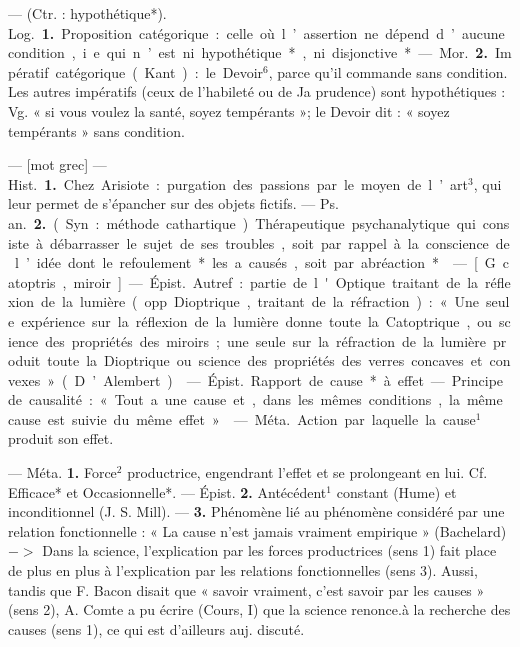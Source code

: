 \begin{itemize}[leftmargin=1cm, label=, itemsep=11pt]
 — (Ctr. : hypothétique*).
\si{Log.} {\bf 1.} Proposition catégorique :
celle où l’assertion ne dépend d’aucune condition, i. e. qui n’est ni
hypothétique*, ni disjonctive*.

— \si{Mor.}  {\bf 2.} Impératif catégorique
(Kant) : le Devoir$^6$, parce qu'il
commande sans condition. Les
autres impératifs (ceux de l’habileté
ou de Ja prudence) sont hypothétiques : Vg. « si vous voulez la santé,
soyez tempérants »; le Devoir dit :
« soyez tempérants » sans condition.

 — [mot grec] — \si{Hist.} {\bf 1.} Chez
Arisiote : purgation des passions par
le moyen de l’art$^3$, qui leur permet
de s’épancher sur des objets fictifs.
— \si{Ps. an.}  {\bf 2.} (Syn. : méthode cathartique). Thérapeutique psychanalytique qui consiste à débarrasser le
sujet de ses troubles, soit par rappel
à la conscience de l’idée dont le
refoulement* les a causés, soit par
abréaction*.

 — [G. catoptris, miroir] —
\si{Épist.} Autref. : partie de l'Optique
traitant de la réflexion de la lumière
(opp. Dioptrique, traitant de la
réfraction) : « Une seule expérience
sur la réflexion de la lumière donne
toute la Catoptrique, ou science des
propriétés des miroirs; une seule sur
la réfraction de la lumière produit.
toute la Dioptrique ou science des

propriétés des verres concaves et
convexes » (D’Alembert).

 — \si{Épist.} Rapport de cause*
à effet. — Principe de causalité :
« Tout a une cause et, dans les
mêmes conditions, la même cause
est suivie du même effet. »

 — \si{Méta.} Action par laquelle la cause$^1$ produit son effet.

 — Méta. {\bf 1.} Force$^2$ productrice,
engendrant l'effet et se prolongeant
en lui. Cf. Efficace* et Occasionnelle*. — Épist.  {\bf 2.} Antécédent$^1$
constant (Hume) et inconditionnel
(J. S. Mill). —  {\bf 3.} Phénomène lié au
phénomène considéré par une relation fonctionnelle : « La cause n’est
jamais vraiment empirique » (Bachelard) $->$ Dans la science, l'explication par les forces productrices
(sens 1) fait place de plus en plus à
l’explication par les relations fonctionnelles (sens 3). Aussi, tandis
que F. Bacon disait que « savoir
vraiment, c’est savoir par les causes »
(sens 2), A. Comte a pu écrire
(Cours, I) que la science renonce.à
la recherche des causes (sens 1), ce
qui est d'ailleurs auj. discuté.


\end{itemize}
